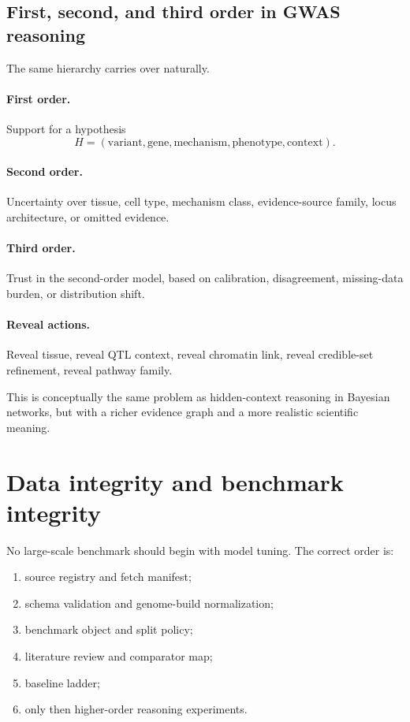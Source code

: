 \documentclass[11pt]{article}
\begin{document}
\subsection{First, second, and third order in GWAS reasoning}
The same hierarchy carries over naturally.

\paragraph{First order.}
Support for a hypothesis
\begin{equation}
H=(\text{variant},\text{gene},\text{mechanism},\text{phenotype},\text{context}).
\end{equation}

\paragraph{Second order.}
Uncertainty over tissue, cell type, mechanism class, evidence-source family, locus architecture, or omitted evidence.

\paragraph{Third order.}
Trust in the second-order model, based on calibration, disagreement, missing-data burden, or distribution shift.

\paragraph{Reveal actions.}
Reveal tissue, reveal QTL context, reveal chromatin link, reveal credible-set refinement, reveal pathway family.

This is conceptually the same problem as hidden-context reasoning in Bayesian networks, but with a richer evidence graph and a more realistic scientific meaning.

\section{Data integrity and benchmark integrity}
No large-scale benchmark should begin with model tuning. The correct order is:
\begin{enumerate}[label=\arabic*.]
    \item source registry and fetch manifest;
    \item schema validation and genome-build normalization;
    \item benchmark object and split policy;
    \item literature review and comparator map;
    \item baseline ladder;
    \item only then higher-order reasoning experiments.
\end{enumerate}
\end{document}
